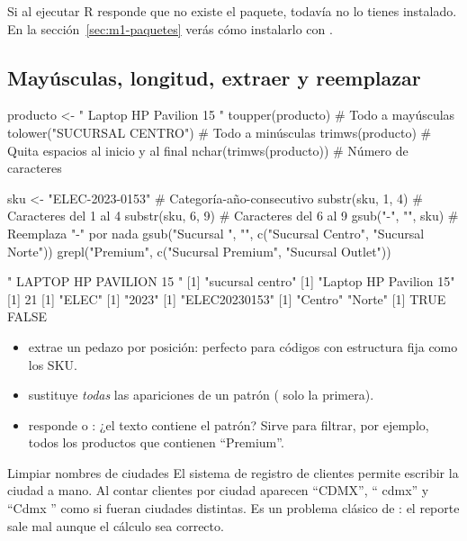 \begin{consejo}
Si al ejecutar  R responde que no existe el
paquete, todavía no lo tienes instalado. En la
sección~\ref{sec:m1-paquetes} verás cómo instalarlo con
.
\end{consejo}

\subsection{Mayúsculas, longitud, extraer y reemplazar}

\begin{rcode}
producto <- "  Laptop HP Pavilion 15  "
toupper(producto)                  # Todo a mayúsculas
tolower("SUCURSAL CENTRO")         # Todo a minúsculas
trimws(producto)                   # Quita espacios al inicio y al final
nchar(trimws(producto))            # Número de caracteres

sku <- "ELEC-2023-0153"            # Categoría-año-consecutivo
substr(sku, 1, 4)                  # Caracteres del 1 al 4
substr(sku, 6, 9)                  # Caracteres del 6 al 9
gsub("-", "", sku)                 # Reemplaza "-" por nada
gsub("Sucursal ", "", c("Sucursal Centro", "Sucursal Norte"))
grepl("Premium", c("Sucursal Premium", "Sucursal Outlet"))
\end{rcode}
\begin{rsalida}
[1] "  LAPTOP HP PAVILION 15  "
[1] "sucursal centro"
[1] "Laptop HP Pavilion 15"
[1] 21
[1] "ELEC"
[1] "2023"
[1] "ELEC20230153"
[1] "Centro" "Norte" 
[1]  TRUE FALSE
\end{rsalida}

\begin{itemize}
  \item {} extrae un pedazo por posición:
        perfecto para códigos con estructura fija como los SKU.
  \item {} sustituye \emph{todas}
        las apariciones de un patrón ( solo la primera).
  \item {} responde  o
        : ¿el texto contiene el patrón? Sirve para filtrar,
        por ejemplo, todos los productos que contienen ``Premium''.
\end{itemize}

\begin{ejemplo}{Limpiar nombres de ciudades}
El sistema de registro de clientes permite escribir la ciudad a mano. Al
contar clientes por ciudad aparecen ``CDMX'', `` cdmx'' y ``Cdmx '' como si
fueran ciudades distintas. Es un problema clásico de : el reporte sale mal aunque el cálculo sea correcto.
\end{ejemplo}

